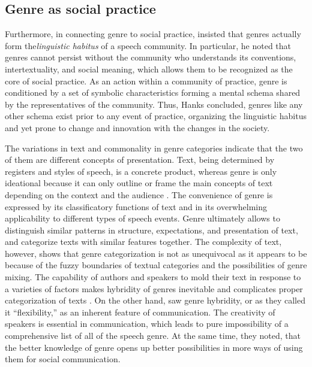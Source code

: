 \documentclass[12pt, draft]{article}
\begin{document}
\subsection{Genre as social practice}
Furthermore, in connecting genre to social practice, \textcite{hanks1987} insisted that genres actually form the\textit{linguistic habitus} of a speech community. In particular, he noted that genres cannot persist without the community who understands its conventions, intertextuality, and social meaning, which allows them to be recognized as the core of social practice. As an action within a community of practice, genre is conditioned by a set of symbolic characteristics forming a mental schema shared by the representatives of the community. Thus, Hanks concluded, genres like any other schema exist prior to any event of practice, organizing the linguistic habitus and yet prone to change and innovation with the changes in the society.

The variations in text and commonality in genre categories indicate that the two of them are different concepts of presentation. Text, being determined by registers and styles of speech, is a concrete product, whereas genre is only ideational because it can only outline or frame the main concepts of text depending on the context and the audience \parencite{bax2011}. The convenience of genre is expressed by its classificatory functions of text and in its overwhelming applicability to different types of speech events. Genre ultimately allows to distinguish similar patterns in structure, expectations, and presentation of text, and categorize texts with similar features together. The complexity of text, however, shows that genre categorization is not as unequivocal as it appears to be because of the fuzzy boundaries of textual categories and the possibilities of genre mixing. The capability of authors and speakers to mold their text in response to a varieties of factors makes hybridity of genres inevitable and complicates proper categorization of texts \parencite{bax2011}. On the other hand, \textcite{bakhtin1986} saw genre hybridity, or as they called it ``flexibility,'' as an inherent feature of communication. The creativity of speakers is essential in communication, which leads to pure impossibility of a comprehensive list of all of the speech genre. At the same time, they noted, that the better knowledge of genre opens up better possibilities in more ways of using them for social communication.
\end{document}
